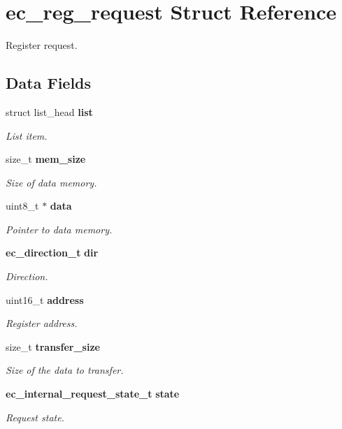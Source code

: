 \section{ec\-\_\-reg\-\_\-request \-Struct \-Reference}
\label{structec__reg__request}


\-Register request.  


\subsection*{\-Data \-Fields}
\begin{DoxyCompactItemize}
\item 
struct list\-\_\-head {\bf list}
\begin{DoxyCompactList}\small\item\em \-List item. \end{DoxyCompactList}\item 
size\-\_\-t {\bf mem\-\_\-size}
\begin{DoxyCompactList}\small\item\em \-Size of data memory. \end{DoxyCompactList}\item 
uint8\-\_\-t $\ast$ {\bf data}
\begin{DoxyCompactList}\small\item\em \-Pointer to data memory. \end{DoxyCompactList}\item 
{\bf ec\-\_\-direction\-\_\-t} {\bf dir}
\begin{DoxyCompactList}\small\item\em \-Direction. \end{DoxyCompactList}\item 
uint16\-\_\-t {\bf address}
\begin{DoxyCompactList}\small\item\em \-Register address. \end{DoxyCompactList}\item 
size\-\_\-t {\bf transfer\-\_\-size}
\begin{DoxyCompactList}\small\item\em \-Size of the data to transfer. \end{DoxyCompactList}\item 
{\bf ec\-\_\-internal\-\_\-request\-\_\-state\-\_\-t} {\bf state}
\begin{DoxyCompactList}\small\item\em \-Request state. \end{DoxyCompactList}\end{DoxyCompactItemize}


